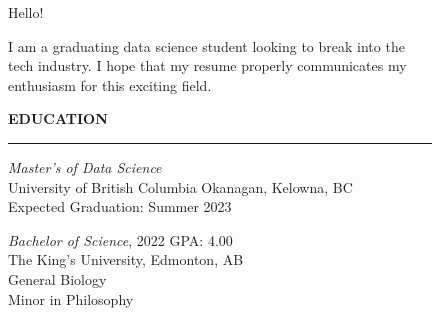 \documentclass[11pt, a4paper]{article}
\newenvironment{mybox}[3][]{%
    \begin{tikzpicture}[#1]%
        \def\myboxname{#3}%
        \node [draw,inner sep=1.5ex,text width=#2]%
            (BOXCONTENT) \bgroup\rule{0pt}{3ex}\ignorespaces
}{%
        \egroup;
        \node [right,inner xsep=1em,fill=bancolor!75,outer sep=0pt,text height=2ex,text depth=.5ex] (BOXNAME) 
            at ([shift={(-1em,0pt)}]BOXCONTENT.north west) {\myboxname};
        \fill[bancolor] (BOXNAME.south west) -- +(1em,-1em) -- +(1em,0) -- cycle;
    \end{tikzpicture}
}
\newcommand{\comment}[1]{}
\begin{document}
\begin{figure}[H]
\begin{minipage}[t]{0.7\textwidth}
\noindent
\vspace{0pt}

\par

\vspace{1pc}

Hello! 
\par
I am a graduating data science student looking to break into the tech industry. I hope that my resume properly communicates my enthusiasm for this exciting field. \\

\vspace{1pc}

\comment{
\begin{mybox}{\textwidth}{Education}
    This is the longer content \\
    This is the longer content \\
    This is the longer content \\
    This is the longer content \\
    This is the longer content
\end{mybox}	
}


\textbf{\large{EDUCATION}}
\par\noindent\rule{\textwidth}{1.0pt}
\par
\vspace{0.5pc}



\noindent\textit{Master's of Data Science} \\
\hspace{1pc} University of British Columbia Okanagan, Kelowna, BC \\
\hspace{1pc} Expected Graduation: Summer 2023 \\

\vspace{0.5pc}

\noindent\textit{Bachelor of Science}, 2022 \hfill GPA: 4.00 \\
\hspace{1pc} The King’s University, Edmonton, AB \\
\hspace{1pc} General Biology \\
\hspace{1pc} Minor in Philosophy


\end{minipage}
\end{figure}
\end{document}

